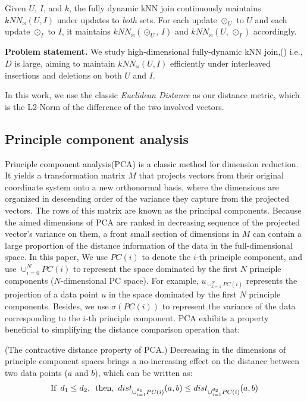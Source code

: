 \begin{definition}\label{def:fully-dynamic-knnj}
Given $U$, $I$, and $k$, the fully dynamic kNN join continuously maintains $kNN_{\bowtie}(U,I)$
under updates to \emph{both} sets.
For each update $\odot_U$ to $U$ and each update $\odot_I$ to $I$, it maintains $kNN_{\bowtie}(\odot_{U},\, I)$ and $kNN_{\bowtie}(U,\, \odot_{I})$ accordingly.
\end{definition}

\noindent\textbf{Problem statement.}
We study high-dimensional fully-dynamic kNN join,(\fdknnj) i.e., $D$ is large, aiming to maintain $kNN_{\bowtie}(U,I)$ efficiently under interleaved insertions and deletions on both $U$ and $I$.

In this work, we use the classic \textit{Euclidean Distance} as our distance metric, which is the L2-Norm \cite{kumar2022l2} of the difference of the two involved vectors.



 

\subsection{Principle component analysis}  Principle component analysis\cite{wold1987principal, chakrabarti2000local, abdi2010principal, vidal2016principal}(PCA) is a classic method for dimension reduction. It yields a transformation matrix $M$ that projects vectors from their original coordinate system onto a new orthonormal basis, where the dimensions are organized in descending order of the variance they capture from the projected vectors. The rows of this matrix are known as the principal components. Because the aimed dimensions of PCA are ranked in decreasing sequence of the projected vector's variance on them, a front small section of dimensions in $M$ can contain a large proportion of the distance information of the data in the full-dimensional space. In this paper, We use $PC(i)$ to denote the $i$-th principle component, and use $\cup^{N}_{i=0}PC(i)$ to represent the space dominated by the first $N$ principle components ($N$-dimensional PC space). For example, $u_{\cup^{N}_{k=1}PC(i)}$ represents the projection of a data point $u$ in the space dominated by the first $N$ principle components. Besides, we use $\sigma(PC(i))$ to represent the variance of the data corresponding to the $i$-th principle component. PCA exhibits a property beneficial to simplifying the distance comparison operation that:
\begin{lemma}(The contractive distance property of PCA.)
\label{lm:pca_decrease_dist}
    Decreasing in the dimensions of principle component spaces brings a no-increasing effect on the distance between two data points ($a$ and $b$), which can be written as:    
        \[\text{If}\hspace{0.5em} d_1\leq d_2,\hspace{0.5em} \text{then,} \hspace{0.5em} dist_{\cup^{d_1}_{i=1}PC(i)}(a,b)\leq dist_{\cup^{d_2}_{i=1}PC(i)}(a,b)\]    
\end{lemma}

